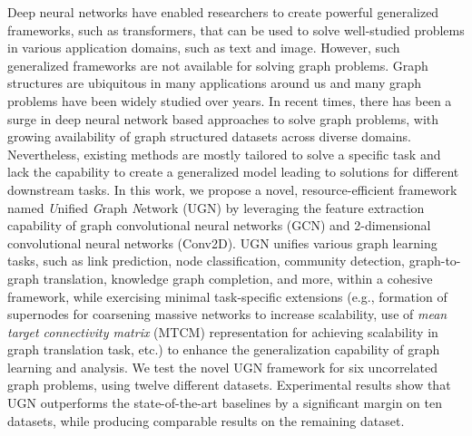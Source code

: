 Deep neural networks have enabled researchers to create powerful generalized frameworks, such as transformers, that can be used to solve well-studied problems in various application domains, such as text and image. However, such generalized frameworks are not available for solving graph problems. Graph structures are ubiquitous in many applications around us and many graph problems have been widely studied over years. In recent times, there has been a surge in deep neural network based approaches to solve graph problems, with growing availability of graph structured datasets across diverse domains. Nevertheless, existing methods are mostly tailored to solve a specific task and lack the capability to create a generalized model leading to solutions for different downstream tasks. In this work, we propose a novel, resource-efficient framework named \emph{U}nified \emph{G}raph \emph{N}etwork (UGN) by leveraging the feature extraction capability of graph convolutional neural networks (GCN) and 2-dimensional convolutional neural networks (Conv2D). UGN unifies various graph learning tasks, such as link prediction, node classification, community detection, graph-to-graph translation, knowledge graph completion, and more, within a cohesive framework, while exercising minimal task-specific extensions (e.g., formation of supernodes for coarsening massive networks to increase scalability, use of \textit{mean target connectivity matrix} (MTCM) representation for achieving scalability in graph translation task, etc.) to enhance the generalization capability of graph learning and analysis. We test the novel UGN framework for six uncorrelated graph problems, using twelve different datasets. Experimental results show that UGN outperforms the state-of-the-art baselines by a significant margin on ten datasets, while producing comparable results on the remaining dataset.




